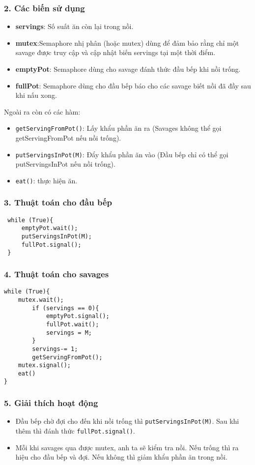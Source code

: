 \subsubsection*{2. Các biến sử dụng}
\begin{itemize}
    \item \textbf{servings}: Số suất ăn còn lại trong nồi.
    \item \textbf{mutex}:Semaphore nhị phân (hoặc mutex) dùng để đảm bảo rằng chỉ một savage được truy cập và cập nhật biến servings tại một thời điểm.
    \item \textbf{emptyPot}: Semaphore dùng cho savage đánh thức đầu bếp khi nồi trống.
    \item \textbf{fullPot}: Semaphore dùng cho đầu bếp báo cho các savage biết nồi đã đầy sau khi nấu xong.
\end{itemize}

Ngoài ra còn có các hàm:
\begin{itemize}
    \item  \texttt{getServingFromPot()}: Lấy khẩu phần ăn ra (Savages không thể gọi getServingFromPot nếu nồi trống).
    \item  \texttt{putServingsInPot(M)}: Đẩy khẩu phần ăn vào (Đầu bếp chỉ có thể gọi putServingsInPot nếu nồi trống).
    \item  \texttt{eat()}: thực hiện ăn.
\end{itemize}

\subsubsection*{3. Thuật toán cho đầu bếp}
\begin{lstlisting}
 while (True){
     emptyPot.wait();
     putServingsInPot(M);
     fullPot.signal();
 }
\end{lstlisting}

\subsubsection*{4. Thuật toán cho savages}
\begin{lstlisting}
while (True){
    mutex.wait();
        if (servings == 0){
            emptyPot.signal();
            fullPot.wait();
            servings = M;
        }
        servings-= 1;
        getServingFromPot();
    mutex.signal();
    eat()
}
\end{lstlisting}

\subsubsection*{5. Giải thích hoạt động}
\begin{itemize}
    \item  Đầu bếp chờ đợi cho đến khi nồi trống thì \texttt{putServingsInPot(M)}. Sau khi thêm thì đánh thức \texttt{fullPot.signal()}.
    \item Mỗi khi savages qua được mutex, anh ta sẽ kiểm tra nồi. Nếu trống thì ra hiệu cho đầu bếp và đợi. Nếu không thì giảm khẩu phần ăn trong nồi.
\end{itemize}
\newpage
